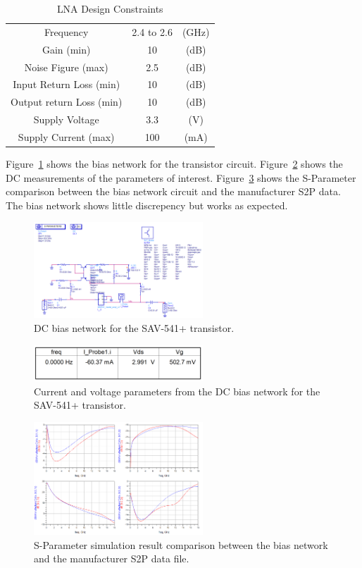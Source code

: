 \documentclass[conference]{IEEEtran}
\begin{document}
\begin{table}[!b]
\caption{LNA Design Constraints}
\centering
    \begin{tabular}{c c c}
    
  	Frequency & 2.4 to 2.6 & (GHz)\\
	Gain (min) & 10 & (dB)\\
	Noise Figure (max) & 2.5 & (dB)\\
	Input Return Loss (min) & 10 & (dB)\\
	Output return Loss (min) & 10 & (dB)\\
	Supply Voltage & 3.3 & (V)\\
	Supply Current (max) & 100 & (mA)\\
    \end{tabular}
\label{tab:fsk24}
\end{table}

Figure~\ref{fig:dccircuit} shows the bias network for the transistor circuit.  Figure~\ref{fig:dcvalues} shows the DC measurements of the parameters of interest.  Figure~\ref{fig:sparamresult} shows the S-Parameter comparison between the bias network circuit and the manufacturer S2P data.  The bias network shows little discrepency but works as expected.

\begin{figure}[!h]
\centering
\includegraphics[width=2.5in]{pics/DCBiasNetwork.png}
\caption{DC bias network for the SAV-541+ transistor.}
\label{fig:dccircuit}
\end{figure}

\begin{figure}[!h]
\centering
\includegraphics[width=2.5in]{pics/DCBiasResults.png}
\caption{Current and voltage  parameters from the DC bias network for the SAV-541+ transistor.}
\label{fig:dcvalues}
\end{figure}

\begin{figure}[!h]
\centering
\includegraphics[width=2.5in]{pics/SParameterComparison.png}
\caption{S-Parameter simulation result comparison between the bias network and the manufacturer S2P data file.}
\label{fig:sparamresult}
\end{figure}
\end{document}
